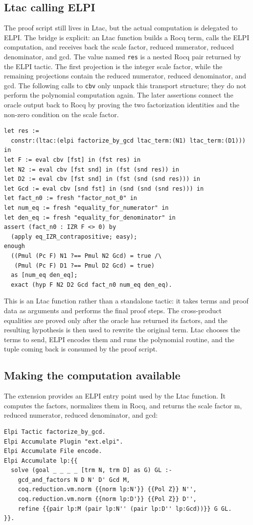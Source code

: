 \documentclass[11pt]{article}
\begin{document}
\subsection{Ltac calling ELPI}
The proof script still lives in Ltac, but the actual computation is delegated to
ELPI. The bridge is explicit: an Ltac function builds a Rocq term, calls the
ELPI computation, and receives back the scale factor, reduced numerator, reduced denominator, and gcd.
The value named \texttt{res} is a nested Rocq pair returned by the ELPI tactic.
The first projection is the integer scale factor, while the remaining
projections contain the reduced numerator, reduced denominator, and gcd. The
following calls to \texttt{cbv} only unpack this transport structure; they do
not perform the polynomial computation again. The later assertions connect the
oracle output back to Rocq by proving the two factorization identities and the
non-zero condition on the scale factor.
\begin{lstlisting}
let res :=
  constr:(ltac:(elpi factorize_by_gcd ltac_term:(N1) ltac_term:(D1))) in
let F := eval cbv [fst] in (fst res) in
let N2 := eval cbv [fst snd] in (fst (snd res)) in
let D2 := eval cbv [fst snd] in (fst (snd (snd res))) in
let Gcd := eval cbv [snd fst] in (snd (snd (snd res))) in
let fact_n0 := fresh "factor_not_0" in
let num_eq := fresh "equality_for_numerator" in
let den_eq := fresh "equality_for_denominator" in
assert (fact_n0 : IZR F <> 0) by
  (apply eq_IZR_contrapositive; easy);
enough
  ((Pmul (Pc F) N1 ?== Pmul N2 Gcd) = true /\
   (Pmul (Pc F) D1 ?== Pmul D2 Gcd) = true)
  as [num_eq den_eq];
  exact (hyp F N2 D2 Gcd fact_n0 num_eq den_eq).
\end{lstlisting}
This is an Ltac function rather than a standalone tactic: it takes terms and
proof data as arguments and performs the final proof steps. The cross-product
equalities are proved only after the oracle has returned its factors, and the
resulting hypothesis is then used to rewrite the original term. Ltac chooses the
terms to send, ELPI encodes them and runs the polynomial routine, and the tuple
coming back is consumed by the proof script.


\subsection{Making the computation available}
The extension provides an ELPI entry point used by the Ltac function. It computes
the factors, normalizes them in Rocq, and returns the scale factor m,
reduced numerator, reduced denominator, and gcd:
\begin{lstlisting}
Elpi Tactic factorize_by_gcd.
Elpi Accumulate Plugin "ext.elpi".
Elpi Accumulate File encode.
Elpi Accumulate lp:{{
  solve (goal _ _ _ _ [trm N, trm D] as G) GL :-
    gcd_and_factors N D N' D' Gcd M,
    coq.reduction.vm.norm {{norm lp:N'}} {{Pol Z}} N'',
    coq.reduction.vm.norm {{norm lp:D'}} {{Pol Z}} D'',
    refine {{pair lp:M (pair lp:N'' (pair lp:D'' lp:Gcd))}} G GL.
}}.
\end{lstlisting}
\end{document}

